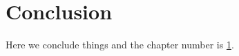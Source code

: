 \chapter{Conclusion} \label{cha:conclusion}
Here we conclude things and the chapter number is \ref{cha:conclusion}.\\

